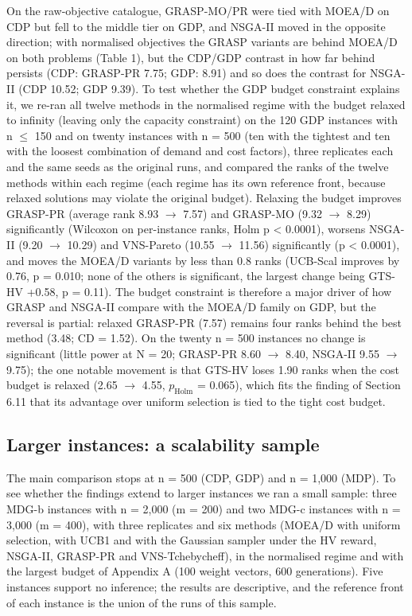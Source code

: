 On the raw-objective catalogue, GRASP-MO/PR were tied with MOEA/D on CDP but fell to the middle tier on GDP, and NSGA-II moved in the opposite direction; with normalised objectives the GRASP variants are behind MOEA/D on both problems (Table 1), but the CDP/GDP contrast in how far behind persists (CDP: GRASP-PR 7.75; GDP: 8.91) and so does the contrast for NSGA-II (CDP 10.52; GDP 9.39). To test whether the GDP budget constraint explains it, we re-ran all twelve methods in the normalised regime with the budget relaxed to infinity (leaving only the capacity constraint) on the 120 GDP instances with n $\leq$ 150 and on twenty instances with n = 500 (ten with the tightest and ten with the loosest combination of demand and cost factors), three replicates each and the same seeds as the original runs, and compared the ranks of the twelve methods within each regime (each regime has its own reference front, because relaxed solutions may violate the original budget). Relaxing the budget improves GRASP-PR (average rank 8.93 $\rightarrow$ 7.57) and GRASP-MO (9.32 $\rightarrow$ 8.29) significantly (Wilcoxon on per-instance ranks, Holm p < 0.0001), worsens NSGA-II (9.20 $\rightarrow$ 10.29) and VNS-Pareto (10.55 $\rightarrow$ 11.56) significantly (p < 0.0001), and moves the MOEA/D variants by less than 0.8 ranks (UCB-Scal improves by 0.76, p = 0.010; none of the others is significant, the largest change being GTS-HV +0.58, p = 0.11). The budget constraint is therefore a major driver of how GRASP and NSGA-II compare with the MOEA/D family on GDP, but the reversal is partial: relaxed GRASP-PR (7.57) remains four ranks behind the best method (3.48; CD = 1.52). On the twenty n = 500 instances no change is significant (little power at N = 20; GRASP-PR 8.60 $\rightarrow$ 8.40, NSGA-II 9.55 $\rightarrow$ 9.75); the one notable movement is that GTS-HV loses 1.90 ranks when the cost budget is relaxed (2.65 $\rightarrow$ 4.55, $p_{\mathrm{Holm}}$ = 0.065), which fits the finding of Section 6.11 that its advantage over uniform selection is tied to the tight cost budget.

\subsection{Larger instances: a scalability sample}\label{sec:larger_instances_a_scalabili}

The main comparison stops at n = 500 (CDP, GDP) and n = 1,000 (MDP). To see whether the findings extend to larger instances we ran a small sample: three MDG-b instances with n = 2,000 (m = 200) and two MDG-c instances with n = 3,000 (m = 400), with three replicates and six methods (MOEA/D with uniform selection, with UCB1 and with the Gaussian sampler under the HV reward, NSGA-II, GRASP-PR and VNS-Tchebycheff), in the normalised regime and with the largest budget of Appendix A (100 weight vectors, 600 generations). Five instances support no inference; the results are descriptive, and the reference front of each instance is the union of the runs of this sample.

